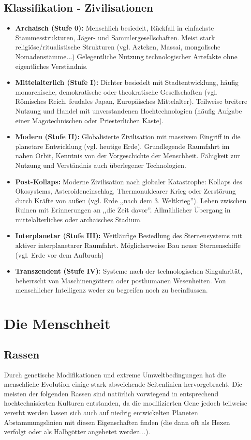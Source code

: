 \documentclass[10pt,a4paper]{report}
\begin{document}
\section{Klassifikation - Zivilisationen}
\begin{itemize}
\item \textbf{Archaisch (Stufe 0):} Menschlich besiedelt, Rückfall in einfachste Stammesstrukturen, Jäger- und Sammlergesellschaften. Meist stark religiöse/ritualistische Strukturen (vgl. Azteken, Massai, mongolische Nomadenstämme...) Gelegentliche Nutzung technologischer Artefakte ohne eigentliches Verständnis.
\item \textbf{Mittelalterlich (Stufe I):} Dichter besiedelt mit Stadtentwicklung, häufig monarchische, demokratische oder theokratische Gesellschaften (vgl. Römisches Reich, feudales Japan, Europäisches Mittelalter). Teilweise breitere Nutzung und Handel mit unverstandenen Hochtechnologien (häufig Aufgabe einer Magotechnischen oder Priesterlichen Kaste).
\item \textbf{Modern (Stufe II):} Globalisierte Zivilisation mit massivem Eingriff in die planetare Entwicklung (vgl. heutige Erde). Grundlegende Raumfahrt im nahen Orbit, Kenntnis von der Vorgeschichte der Menschheit. Fähigkeit zur Nutzung und Verständnis auch überlegener Technologien.
\item \textbf{Post-Kollaps:} Moderne Zivilisation nach globaler Katastrophe: Kollaps des Ökosystems, Asteroideneinschlag, Thermonuklearer Krieg oder Zerstörung durch Kräfte von außen (vgl. Erde ,,nach dem 3. Weltkrieg''). Leben zwischen Ruinen mit Erinnerungen an ,,die Zeit davor''. Allmählicher Übergang in mittelalterliches oder archaisches Stadium.
\item \textbf{Interplanetar (Stufe III):} Weitläufige Besiedlung des Sternensystems mit aktiver interplanetarer Raumfahrt. Möglicherweise Bau neuer Sternenschiffe (vgl. Erde vor dem Aufbruch)
\item \textbf{Transzendent (Stufe IV):} Systeme nach der technologischen Singularität, beherrscht von Maschinengöttern oder posthumanen Wesenheiten. Von menschlicher Intelligenz weder zu begreifen noch zu beeinflussen.
\end{itemize}

\chapter{Die Menschheit}
\section{Rassen}
Durch genetische Modifikationen und extreme Umwelt\-bedin\-gungen hat die menschliche Evolution einige stark abweichende Seitenlinien hervorgebracht. Die meisten der folgenden Rassen sind natürlich vorwiegend in ent\-sprechend hochtechnisierten Kulturen entstanden, da die modifizierten Gene jedoch teilweise vererbt werden lassen sich auch auf niedrig entwickelten Planeten Abstammungslinien mit diesen Eigenschaften finden (die dann oft als Hexen verfolgt oder als Halbgötter angebetet werden...).
\end{document}
